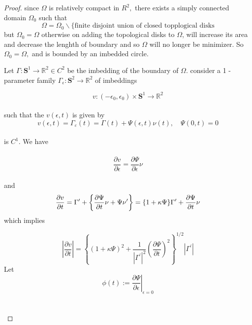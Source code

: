\documentclass[oneside]{book}
\begin{document}
\begin{proof}

 since $\Omega$ is relatively compact in $R^{2},$ there exists a simply connected
domain $\Omega_{0}$ such that
$$
\Omega=\Omega_{0} \backslash\{\text{finite disjoint union of closed topplogical disks} $$
 but $\Omega_{0}=\Omega $ otherwise on adding the
topological disks to $\Omega$, will increase its area  and decrease the lenghth of boundary and so $\Omega$ will no longer be minimizer. So $\Omega_{0}=\Omega,$ and is bounded by an imbedded circle.\par
Let $\Gamma: \mathbf{S}^{1} \rightarrow \mathbb{R}^{2} \in C^{2}$ be the imbedding of the boundary of $\Omega .$ 
consider a 1 -parameter family $\Gamma_{\epsilon}: \mathbf{S}^{2} \rightarrow \mathbb{R}^{2}$ of imbeddings
\par
$$
v:\left(-\epsilon_{0}, \epsilon_{0}\right) \times \mathbf{S}^{1} \rightarrow \mathbb{R}^{2}
$$ \\
such that the  $v(\epsilon, t)$ is given by \\
    \begin{equation}
v(\epsilon, t)=\Gamma_{\varepsilon}(t)=\Gamma(t)+\Psi(\epsilon, t) \nu(t), \quad \Psi(0, t)=0
    \end{equation} \\
is $C^{1} .$ We have \\\\
  \begin{equation}
\frac{\partial v}{\partial \epsilon}=\frac{\partial \Psi}{\partial \epsilon} \nu
    \end{equation}
 \\ 
 and 
     \begin{equation}
    \\  \frac{\partial v}{\partial t}=\Gamma^{\prime}+\left\{\frac{\partial \Psi}{\partial t} \nu+\Psi \nu^{\prime}\right\}=\{1+\kappa \Psi\} \Gamma^{\prime}+\frac{\partial \Psi}{\partial t} \nu
                   \end{equation}    
which implies  

                    $$\left|\frac{\partial v}{\partial t}\right|=\left\{(1+\kappa \Psi)^{2}+\frac{1}{\left|\Gamma^{\prime}\right|^{2}}\left(\frac{\partial \Psi}{\partial t}\right)^{2}\right\}^{1 / 2}\left|\Gamma^{\prime}\right|$$
Let   \\
                     
                      $$\phi(t):=\left.\frac{\partial \Psi}{\partial \epsilon}\right|_{\epsilon=0}$$ \\\\
                      

\end{proof}
\end{document}
